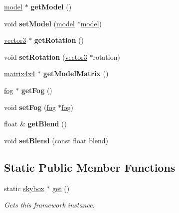 \begin{DoxyCompactItemize}
\hyperlink{classflounder_1_1model}{model} $\ast$ {\bfseries get\+Model} ()
\item 
\mbox{\label{classflounder_1_1skybox_a72040c886a38cfc5dccb1b7d93471bee}} 
void {\bfseries set\+Model} (\hyperlink{classflounder_1_1model}{model} $\ast$\hyperlink{classflounder_1_1model}{model})
\item 
\mbox{\label{classflounder_1_1skybox_a887c324dbc5174dd38d8be6e2fb9ed04}} 
\hyperlink{classflounder_1_1vector3}{vector3} $\ast$ {\bfseries get\+Rotation} ()
\item 
\mbox{\label{classflounder_1_1skybox_ace1bd7310c363d6bcbdb14b814bd5447}} 
void {\bfseries set\+Rotation} (\hyperlink{classflounder_1_1vector3}{vector3} $\ast$rotation)
\item 
\mbox{\label{classflounder_1_1skybox_aa60fd072acdc4fd7749625aa51d0ee63}} 
\hyperlink{classflounder_1_1matrix4x4}{matrix4x4} $\ast$ {\bfseries get\+Model\+Matrix} ()
\item 
\mbox{\label{classflounder_1_1skybox_a9f964aed2c989f0b864bd7e2533cb9f0}} 
\hyperlink{classflounder_1_1fog}{fog} $\ast$ {\bfseries get\+Fog} ()
\item 
\mbox{\label{classflounder_1_1skybox_abf5b6032f01a6005ddef2b2d8d9bddec}} 
void {\bfseries set\+Fog} (\hyperlink{classflounder_1_1fog}{fog} $\ast$\hyperlink{classflounder_1_1fog}{fog})
\item 
\mbox{\label{classflounder_1_1skybox_a48702fe266209968e89659a5e95c6a0c}} 
float \& {\bfseries get\+Blend} ()
\item 
\mbox{\label{classflounder_1_1skybox_a8699bb525b6a2c1e300fc59d0038f70e}} 
void {\bfseries set\+Blend} (const float blend)
\end{DoxyCompactItemize}
\subsection*{Static Public Member Functions}
\begin{DoxyCompactItemize}
\item 
static \hyperlink{classflounder_1_1skybox}{skybox} $\ast$ \hyperlink{classflounder_1_1skybox_a4d6b3b6d783e4ad3d3f060cbd0e04e7c}{get} ()
\begin{DoxyCompactList}\small\item\em Gets this framework instance. \end{DoxyCompactList}\end{DoxyCompactItemize}
